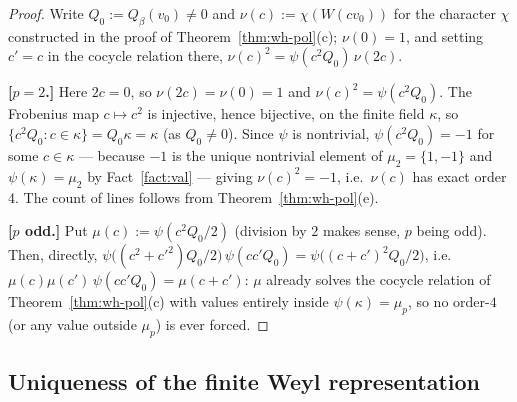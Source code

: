 
\begin{proof}
Write $Q_0:=Q_\beta(v_0)\neq 0$ and $\nu(c):=\chi(W(cv_0))$ for the character
$\chi$ constructed in the proof of Theorem~\ref{thm:wh-pol}(c); $\nu(0)=1$,
and setting $c'=c$ in the cocycle relation there,
$\nu(c)^2 = \psi(c^2Q_0)\,\nu(2c)$.

\textbf{[$p=2$.]} Here $2c=0$, so $\nu(2c)=\nu(0)=1$ and $\nu(c)^2=\psi(c^2Q_0)$.
The Frobenius map $c\mapsto c^2$ is injective, hence bijective, on the finite
field $\kappa$, so $\{c^2Q_0 : c\in\kappa\}=Q_0\kappa=\kappa$ (as $Q_0\neq 0$).
Since $\psi$ is nontrivial, $\psi(c^2Q_0)=-1$ for some $c\in\kappa$ — because
$-1$ is the unique nontrivial element of $\mu_2=\{1,-1\}$ and $\psi(\kappa)=\mu_2$
by Fact~\ref{fact:val} — giving $\nu(c)^2=-1$, i.e.\ $\nu(c)$ has exact
order $4$. The count of lines follows from Theorem~\ref{thm:wh-pol}(e).

\textbf{[$p$ odd.]} Put $\mu(c):=\psi(c^2Q_0/2)$ (division by $2$ makes sense,
$p$ being odd). Then, directly,
$\psi\big((c^2+c'^2)Q_0/2\big)\,\psi(cc'Q_0) = \psi\big((c+c')^2Q_0/2\big)$,
i.e.\ $\mu(c)\mu(c')\,\psi(cc'Q_0)=\mu(c+c')$: $\mu$ already solves the
cocycle relation of Theorem~\ref{thm:wh-pol}(c) with values entirely inside
$\psi(\kappa)=\mu_p$, so no order-$4$ (or any value outside $\mu_p$) is ever
forced.
\end{proof}

\subsection{Uniqueness of the finite Weyl representation}

